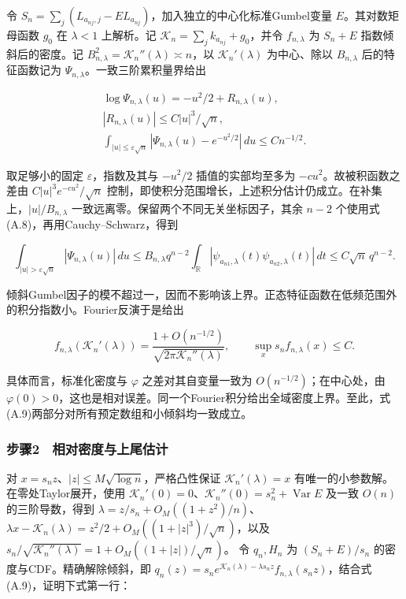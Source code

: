 \documentclass[11pt,a4paper]{article}
\begin{document}
令
\(S_n=\sum_j(L_{a_{nj},j}-EL_{a_{nj}})\)，加入独立的中心化标准Gumbel变量
\(E\)。其对数矩母函数 \(g_0\) 在 \(\lambda<1\) 上解析。记
\(\mathcal K_n=\sum_jk_{a_{nj}}+g_0\)，并令 \(f_{n,\lambda}\) 为
\(S_n+E\) 指数倾斜后的密度。记
\(B_{n,\lambda}^2=\mathcal K_n''(\lambda)\asymp n\)，以
\(\mathcal K_n'(\lambda)\) 为中心、除以 \(B_{n,\lambda}\)
后的特征函数记为 \(\Psi_{n,\lambda}\)。一致三阶累积量界给出

\[
\begin{gathered}
\log\Psi_{n,\lambda}(u)=-u^2/2+R_{n,\lambda}(u),\\
|R_{n,\lambda}(u)|\le C|u|^3/\sqrt n,\\
\int_{|u|\le\varepsilon\sqrt n}
|\Psi_{n,\lambda}(u)-e^{-u^2/2}|\,du\le Cn^{-1/2}.
\end{gathered}
\]

取足够小的固定 \(\varepsilon\)，指数及其与 \(-u^2/2\) 插值的实部均至多为
\(-cu^2\)。故被积函数之差由 \(C|u|^3e^{-cu^2}/\sqrt n\)
控制，即使积分范围增长，上述积分估计仍成立。在补集上，\(|u|/B_{n,\lambda}\)
一致远离零。保留两个不同无关坐标因子，其余 \(n-2\)
个使用式(A.8)，再用Cauchy--Schwarz，得到

\[
\int_{|u|>\varepsilon\sqrt n}|\Psi_{n,\lambda}(u)|\,du
\le B_{n,\lambda}q^{n-2}
\int_{\mathbb R}|\psi_{a_{n1},\lambda}(t)\psi_{a_{n2},\lambda}(t)|\,dt
\le C\sqrt n\,q^{n-2}.
\]

倾斜Gumbel因子的模不超过一，因而不影响该上界。正态特征函数在低频范围外的积分指数小。Fourier反演于是给出

\[
f_{n,\lambda}(\mathcal K_n'(\lambda))
=\frac{1+O(n^{-1/2})}{\sqrt{2\pi\mathcal K_n''(\lambda)}},
\qquad
\sup_x s_nf_{n,\lambda}(x)\le C .
\tag{A.9}
\]

具体而言，标准化密度与 \(\varphi\) 之差对其自变量一致为
\(O(n^{-1/2})\)；在中心处，由
\(\varphi(0)>0\)，这也是相对误差。同一个Fourier积分给出全域密度上界。至此，式(A.9)两部分对所有预定数组和小倾斜均一致成立。

\subsubsection*{步骤2　相对密度与上尾估计}\label{ux6b65ux9aa42-ux76f8ux5bf9ux5bc6ux5ea6ux4e0eux4e0aux5c3eux4f30ux8ba1}

对 \(x=s_nz\)、\(|z|\le M\sqrt{\log n}\)，严格凸性保证
\(\mathcal K_n'(\lambda)=x\) 有唯一的小参数解。在零处Taylor展开，使用
\(\mathcal K_n'(0)=0\)、\(\mathcal K_n''(0)=s_n^2+\operatorname{Var}E\)
及一致 \(O(n)\) 的三阶导数，得到 \(\lambda=z/s_n+O_M((1+z^2)/n)\)、
\(\lambda x-\mathcal K_n(\lambda)=z^2/2+O_M((1+|z|^3)/\sqrt n)\)，以及
\(s_n/\sqrt{\mathcal K_n''(\lambda)}=1+O_M((1+|z|)/\sqrt n)\)。 令
\(q_n,H_n\) 为 \((S_n+E)/s_n\) 的密度与CDF。精确解除倾斜，即
\(q_n(z)=s_ne^{\mathcal K_n(\lambda)-\lambda s_nz}f_{n,\lambda}(s_nz)\)，结合式(A.9)，证明下式第一行：
\end{document}
